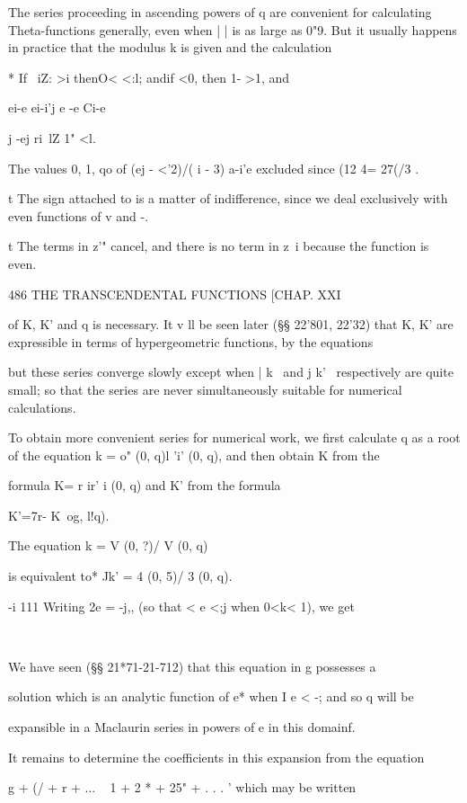 The series proceeding in ascending powers of q are convenient for
calculating Theta-functions generally, even when | | is as large as
0"9. But it usually happens in practice that the modulus k is given
and the calculation

* If \ iZ: >i thenO< <:l; andif <0, then 1- >1, and

ei-e ei-i'j e -e Ci-e

 j -ej ri\ lZ 1" <l.

The values 0, 1, qo of (ej - <'2)/( i - 3) a-i'e excluded since (12 4=
27(/3 .

t The sign attached to is a matter of indifference, since we deal
exclusively with even functions of v and -.

t The terms in z'" cancel, and there is no term in z~i because the
function is even.

486 THE TRANSCENDENTAL FUNCTIONS [CHAP. XXI

of K, K' and q is necessary. It v ll be seen later (§§ 22'801, 22'32)
that K, K' are expressible in terms of hypergeometric functions, by
the equations

but these series converge slowly except when | k \ and j k' \
respectively are quite small; so that the series are never
simultaneously suitable for numerical calculations.

To obtain more convenient series for numerical work, we first
calculate q as a root of the equation k = o" (0, q)l 'i' (0, q), and
then obtain K from the

formula K= r ir' i (0, q) and K' from the formula

K'=7r- K\ og, l!q).

The equation k = V (0, ?)/ V (0, q)

is equivalent to* Jk' = 4 (0, 5)/ 3 (0, q).

-i 111 Writing 2e = -j,, (so that < e <;j when 0<k< 1), we get

\ %

We have seen (§§ 21*71-21-712) that this equation in g possesses a

solution which is an analytic function of e* when I e < -; and so q
will be

expansible in a Maclaurin series in powers of e in this domainf.

It remains to determine the coefficients in this expansion from the
equation

g + (/ + r + ... ~ 1 + 2 * + 25" + . . . ' which may be written

